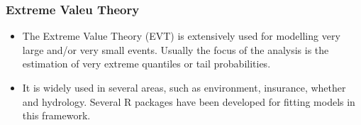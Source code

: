 \documentclass[MAIN.tex]{subfiles}
\begin{document}
 

\begin{frame}
	\frametitle{Extreme Valeu Theory}
	\begin{itemize}
		\item The Extreme Value Theory (EVT) is extensively used for modelling very large and/or very small events. 
		Usually the focus of the analysis is the estimation of very extreme quantiles or tail probabilities. 
		\item It is widely used in several areas, such as environment, insurance, whether and hydrology. 
		Several R packages have been developed for fitting models in this framework. 
	\end{itemize}
\end{frame}
\end{document}
